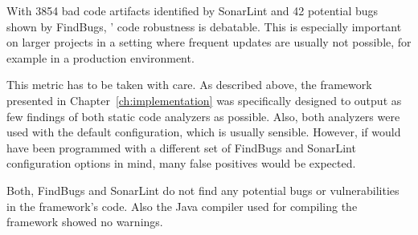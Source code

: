 With 3854 bad code artifacts identified by SonarLint and 42 potential bugs shown by FindBugs, \uimaas{}' code robustness is debatable. This is especially important on larger projects in a setting where frequent updates are usually not possible, for example in a production environment.

This metric has to be taken with care. As described above, the framework presented in Chapter~\ref{ch:implementation} was specifically designed to output as few findings of both static code analyzers as possible. Also, both analyzers were used with the default configuration, which is usually sensible. However, if \uimaas{} would have been programmed with a different set of FindBugs and SonarLint configuration options in mind, many false positives would be expected.

Both, FindBugs and SonarLint do not find any potential bugs or vulnerabilities in the framework's code. Also the Java compiler used for compiling the framework showed no warnings.

